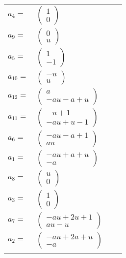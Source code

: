 \documentclass[1p]{elsarticle_modified}
\theoremstyle{definition}
\begin{document}
\begin{tabular}{m{7pt} m{180pt} m{7pt} m{180pt} }
\flushright $a_{4}=$&$\begin{pmatrix}1\\0\end{pmatrix}$ \\
\flushright $a_{9}=$&$\begin{pmatrix}0\\u\end{pmatrix}$ \\
\flushright $a_{5}=$&$\begin{pmatrix}1\\-1\end{pmatrix}$ \\
\flushright $a_{10}=$&$\begin{pmatrix}- u\\u\end{pmatrix}$ \\
\flushright $a_{12}=$&$\begin{pmatrix}a\\- a u- a+u\end{pmatrix}$ \\
\flushright $a_{11}=$&$\begin{pmatrix}- u+1\\- a u+u-1\end{pmatrix}$ \\
\flushright $a_{6}=$&$\begin{pmatrix}- a u- a+1\\a u\end{pmatrix}$ \\
\flushright $a_{1}=$&$\begin{pmatrix}- a u+a+u\\- a\end{pmatrix}$ \\
\flushright $a_{8}=$&$\begin{pmatrix}u\\0\end{pmatrix}$ \\
\flushright $a_{3}=$&$\begin{pmatrix}1\\0\end{pmatrix}$ \\
\flushright $a_{7}=$&$\begin{pmatrix}- a u+2 u+1\\a u- u\end{pmatrix}$ \\
\flushright $a_{2}=$&$\begin{pmatrix}- a u+2 a+u\\- a\end{pmatrix}$\\&\end{tabular}
\end{document}
